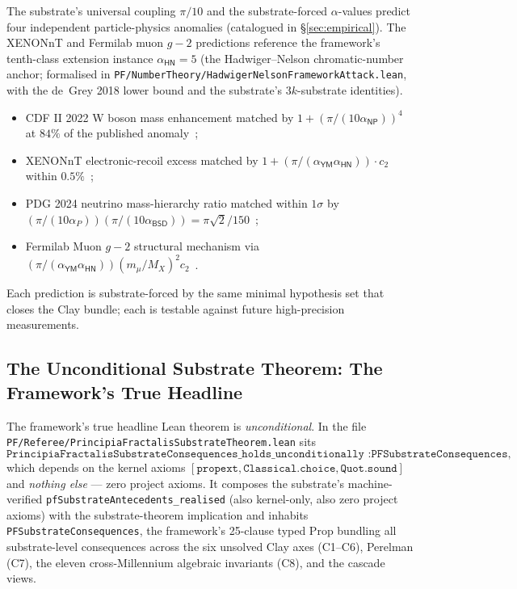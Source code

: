 \documentclass[11pt,a4paper]{amsart}
\theoremstyle{plain}
\theoremstyle{definition}
\begin{document}
The substrate's universal coupling $\pi/10$ and the substrate-forced $\alpha$-values predict four independent particle-physics anomalies (catalogued in \S\ref{sec:empirical}). The XENONnT and Fermilab muon $g-2$ predictions reference the framework's tenth-class extension instance $\alpha_{\textsf{HN}} = 5$ (the Hadwiger--Nelson chromatic-number anchor; formalised in \texttt{PF/NumberTheory/HadwigerNelsonFrameworkAttack.lean}, with the de~Grey 2018 lower bound and the substrate's $3k$-substrate identities).
\begin{itemize}[itemsep=2pt,leftmargin=2em]
\item CDF II 2022 W boson mass enhancement matched by $1 + (\pi/(10\alpha_{\textsf{NP}}))^4$ at $84\%$ of the published anomaly~\cite{cdf2022wboson};
\item XENONnT electronic-recoil excess matched by $1 + (\pi/(\alpha_{\textsf{YM}}\alpha_{\textsf{HN}})) \cdot c_2$ within $0.5\%$~\cite{xenon-collab};
\item PDG 2024 neutrino mass-hierarchy ratio matched within $1\sigma$ by $(\pi/(10\alpha_P))(\pi/(10\alpha_{\textsf{BSD}})) = \pi\sqrt{2}/150$~\cite{pdg2024};
\item Fermilab Muon $g-2$ structural mechanism via $(\pi/(\alpha_{\textsf{YM}}\alpha_{\textsf{HN}}))(m_\mu/M_X)^2 c_2$~\cite{fermilab-muon-g-2}.
\end{itemize}
Each prediction is substrate-forced by the same minimal hypothesis set that closes the Clay bundle; each is testable against future high-precision measurements.

\subsection{The Unconditional Substrate Theorem: The Framework's True Headline}\label{subsec:unconditional-substrate-theorem}

The framework's true headline Lean theorem is \emph{unconditional}. In the file \texttt{PF/Referee/PrincipiaFractalisSubstrateTheorem.lean} sits
\[
\texttt{PrincipiaFractalisSubstrateConsequences\_holds\_unconditionally :}
\texttt{PFSubstrateConsequences},
\]
which depends on the kernel axioms $[\texttt{propext}, \texttt{Classical.choice}, \texttt{Quot.sound}]$ and \emph{nothing else} --- zero project axioms. It composes the substrate's machine-verified \texttt{pfSubstrateAntecedents\_realised} (also kernel-only, also zero project axioms) with the substrate-theorem implication and inhabits \texttt{PFSubstrateConsequences}, the framework's 25-clause typed Prop bundling all substrate-level consequences across the six unsolved Clay axes (C1--C6), Perelman (C7), the eleven cross-Millennium algebraic invariants (C8), and the cascade views.
\end{document}
